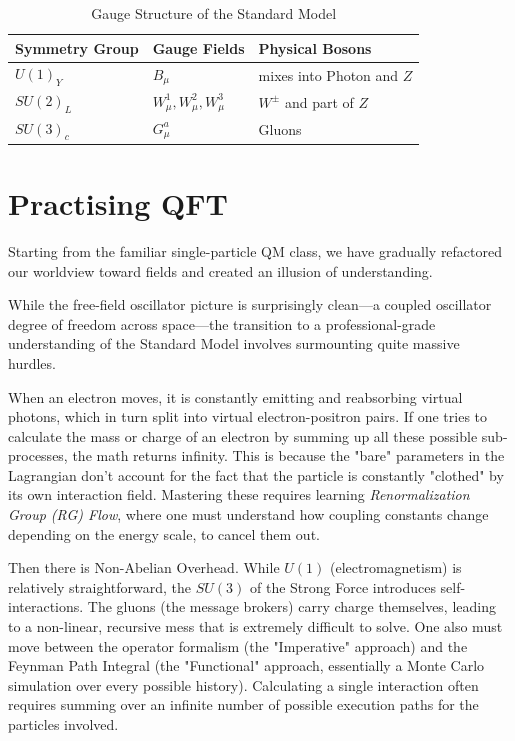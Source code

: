 \begin{table}[h!]
\centering
\begin{tabular}{|l|l|l|}
\hline
\textbf{Symmetry Group} & \textbf{Gauge Fields} & \textbf{Physical Bosons} \\ \hline
$U(1)_Y$ & $B_\mu$ & mixes into Photon and $Z$ \\ \hline
$SU(2)_L$ & $W^1_\mu, W^2_\mu, W^3_\mu$ & $W^\pm$ and part of $Z$ \\ \hline
$SU(3)_c$ & $G^a_\mu$ & Gluons \\ \hline
\end{tabular}
\caption{Gauge Structure of the Standard Model}
\end{table}


\section{Practising QFT}

Starting from the familiar single-particle QM class, we have gradually refactored our worldview toward fields and
created an illusion of understanding.

While the free-field oscillator picture is surprisingly clean—a coupled oscillator degree of freedom across space—the transition to a
professional-grade understanding of the Standard Model involves surmounting quite massive hurdles.

When an electron moves, it is constantly emitting and reabsorbing virtual photons, which in turn split into virtual electron-positron pairs.
If one tries to calculate the mass or charge of an electron by summing up all these possible sub-processes, the math returns infinity.
This is because the "bare" parameters in the Lagrangian don't account for the fact that the particle is constantly "clothed" by its own interaction field.
Mastering these requires learning \textit{Renormalization Group (RG) Flow}, where one must understand how coupling constants change depending on the energy scale,
to cancel them out.

Then there is Non-Abelian Overhead. While $U(1)$ (electromagnetism) is relatively straightforward, the $SU(3)$ of the Strong Force introduces self-interactions.
The gluons (the message brokers) carry charge themselves, leading to a non-linear, recursive mess that is extremely difficult to solve.
One also must move between the operator formalism (the "Imperative" approach) and the Feynman Path Integral (the "Functional" approach,
essentially a Monte Carlo simulation over every possible history).
Calculating a single interaction often requires summing over an infinite number of possible execution paths for the particles involved.

